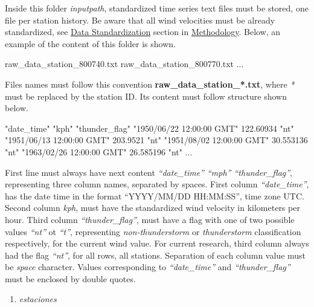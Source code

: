\documentclass[12pt,oneside]{reedthesis}
\newenvironment{Shaded}{\begin{snugshade}}{\end{snugshade}}
\newcommand{\ExtensionTok}[1]{#1}
\newcommand{\StringTok}[1]{\textcolor[rgb]{0.31,0.60,0.02}{#1}}
\providecommand{\tightlist}{%
  \setlength{\itemsep}{0pt}\setlength{\parskip}{0pt}}
\begin{document}
Inside this folder \emph{inputpath}, standardized time series text files must be stored, one file per station history. Be aware that all wind velocities must be already standardized, see \protect\hyperlink{rmd-standardization}{Data Standardization} section in \protect\hyperlink{rmd-method}{Methodology}. Below, an example of the content of this folder is shown.

\scriptsize

\vspace{0.4cm}
\begin{Shaded}
\begin{Highlighting}[]
      \ExtensionTok{raw_data_station_800740.txt}
      \ExtensionTok{raw_data_station_800770.txt}
      \ExtensionTok{...}
\end{Highlighting}
\end{Shaded}
\normalsize

Files names must follow this convention \textbf{raw\_data\_station\_*.txt}, where \emph{*} must be replaced by the station ID. Its content must follow structure shown below.

\scriptsize

\vspace{0.4cm}
\begin{Shaded}
\begin{Highlighting}[]
      \StringTok{"date_time"} \StringTok{"kph"} \StringTok{"thunder_flag"}
      \StringTok{"1950/06/22 12:00:00 GMT"}  \ExtensionTok{122.60934} \StringTok{"nt"}
      \StringTok{"1951/06/13 12:00:00 GMT"}   \ExtensionTok{203.9521} \StringTok{"nt"}
      \StringTok{"1951/08/02 12:00:00 GMT"}  \ExtensionTok{30.553136} \StringTok{"nt"}
      \StringTok{"1963/02/26 12:00:00 GMT"}  \ExtensionTok{26.585196} \StringTok{"nt"}
      \ExtensionTok{...}
\end{Highlighting}
\end{Shaded}
\normalsize

First line must always have next content \emph{``date\_time'' ``mph'' ``thunder\_flag''}, representing three column names, separated by spaces. First column \emph{``date\_time''}, has the date time in the format ``YYYY/MM/DD HH:MM:SS'', time zone UTC. Second column \emph{kph}, must have the standardized wind velocity in kilometers per hour. Third column \emph{``thunder\_flag''}, must have a flag with one of two possible values \emph{``nt''} ot \emph{``t''}, representing \emph{non-thunderstorm} or \emph{thunderstorm} classification respectively, for the current wind value. For current research, third column always had the flag \emph{``nt''}, for all rows, all stations. Separation of each column value must be \emph{space} character. Values corresponding to \emph{``date\_time''} and \emph{``thunder\_flag''} must be enclosed by double quotes.
\begin{enumerate}
\def\labelenumi{\arabic{enumi}.}
\setcounter{enumi}{1}
\tightlist
\item
  \emph{estaciones}
\end{enumerate}
\scriptsize
\end{document}
